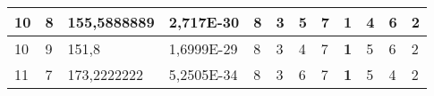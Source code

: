 \documentclass[conference]{IEEEtran}
\begin{document}
\begin{table*}[]
\begin{tabular}{|llll|llllllll|}
\multicolumn{1}{|l|}{10}                                                             & \multicolumn{1}{l|}{8}                                                                 & \multicolumn{1}{l|}{155,5888889}                                                           & 2,717E-30                               & \multicolumn{1}{l|}{8}                                                           & \multicolumn{1}{l|}{3}                                                           & \multicolumn{1}{l|}{5}                                                           & \multicolumn{1}{l|}{7}                                                           & \multicolumn{1}{l|}{\textbf{1}}                                                  & \multicolumn{1}{l|}{4}                                                           & \multicolumn{1}{l|}{6}                                                           & 2                                   \\ \hline
\multicolumn{1}{|l|}{10}                                                             & \multicolumn{1}{l|}{9}                                                                 & \multicolumn{1}{l|}{151,8}                                                                 & 1,6999E-29                              & \multicolumn{1}{l|}{8}                                                           & \multicolumn{1}{l|}{3}                                                           & \multicolumn{1}{l|}{4}                                                           & \multicolumn{1}{l|}{7}                                                           & \multicolumn{1}{l|}{\textbf{1}}                                                  & \multicolumn{1}{l|}{5}                                                           & \multicolumn{1}{l|}{6}                                                           & 2                                   \\ \hline
\multicolumn{1}{|l|}{11}                                                             & \multicolumn{1}{l|}{7}                                                                 & \multicolumn{1}{l|}{173,2222222}                                                           & 5,2505E-34                              & \multicolumn{1}{l|}{8}                                                           & \multicolumn{1}{l|}{3}                                                           & \multicolumn{1}{l|}{6}                                                           & \multicolumn{1}{l|}{7}                                                           & \multicolumn{1}{l|}{\textbf{1}}                                                  & \multicolumn{1}{l|}{5}                                                           & \multicolumn{1}{l|}{4}                                                           & 2                                   \\ \hline

\end{tabular}
\end{table*}
\end{document}
